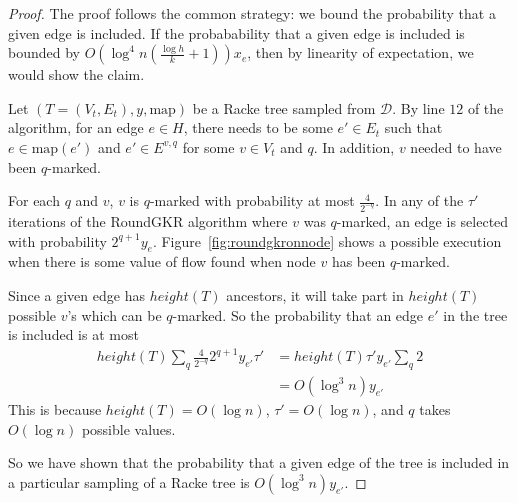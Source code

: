\documentclass[12pt]{article}
\begin{document}
\begin{proof}
The proof follows the common strategy: we bound the probability that a given edge is included. If the probabability that a given edge is included is bounded by $O(\log^4n(\frac{\log h}{k} + 1))x_e$, then by linearity of expectation, we would show the claim.

Let $(T = (V_t, E_t), y, \text{map})$ be a Racke tree sampled from $\mathcal{D}$. By line $12$ of the algorithm, for an edge $e \in H$, there needs to be some $e' \in E_t$ such that $e \in \text{map}(e')$ and $e' \in E^{v,q}$ for some $v \in V_t$ and $q$. In addition, $v$ needed to have been $q$-marked. 

For each $q$ and $v$, $v$ is $q$-marked with probability at most $\frac{4}{2^{-q}}$. In any of the $\tau'$ iterations of the RoundGKR algorithm where $v$ was $q$-marked, an edge is selected with probability $2^{q+1}y_e$. Figure~\ref{fig:roundgkronnode} shows a possible execution when there is some value of flow found when node $v$ has been $q$-marked.

Since a given edge has $height(T)$ ancestors, it will take part in $height(T)$ possible $v$'s which can be $q$-marked. So the probability that an edge $e'$ in the tree is included is at most 
\begin{align}
height(T) \sum_q \frac{4}{2^{-q}} 2^{q+1} y_{e'} \tau' &= height(T) \tau' y_{e'} \sum_q 2 \\
&= O(\log^3 n) y_{e'} 
\end{align}
This is because $height(T) = O(\log n)$, $\tau' = O(\log n)$, and $q$ takes $O(\log n)$ possible values.

So we have shown that the probability that a given edge of the tree is included in a particular sampling of a Racke tree is $O(\log^3 n) y_{e'}$. 


\end{proof}
\end{document}
